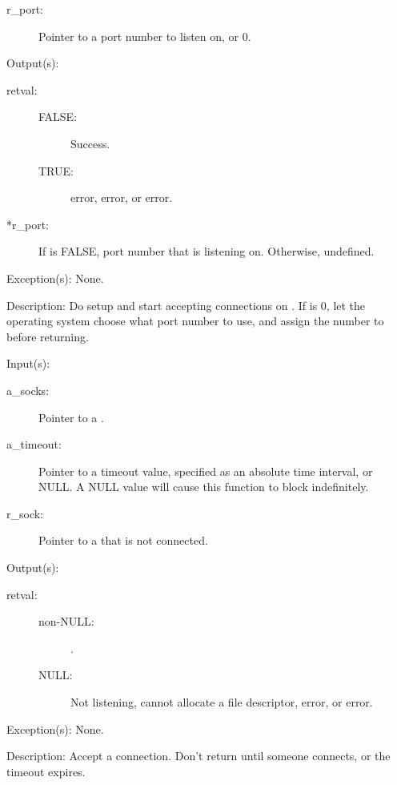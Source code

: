\begin{capi}
\begin{capilist}
\begin{description}
		\item[r\_port: ]
			Pointer to a port number to listen on, or 0.
		\end{description}
	\item[Output(s): ]
		\begin{description}\item[]
		\item[retval: ]
			\begin{description}\item[]
			\item[FALSE: ]
				Success.
			\item[TRUE: ]
				 error,  error, or
				 error.
			\end{description}
		\item[*r\_port: ]
			If  is FALSE, port number that
			 is listening on.  Otherwise, undefined.
		\end{description}
	\item[Exception(s): ] None.
	\item[Description: ]
		Do setup and start accepting connections on .  If
		 is 0, let the operating system choose what port
		number to use, and assign the number to  before
		returning.
	\end{capilist}
\label{socks_accept}
	\begin{capilist}
	\item[Input(s): ]
		\begin{description}\item[]
		\item[a\_socks: ]
			Pointer to a .
		\item[a\_timeout: ]
			Pointer to a timeout value, specified as an absolute
			time interval, or NULL.  A NULL value will cause this
			function to block indefinitely.
		\item[r\_sock: ]
			Pointer to a  that is not connected.
		\end{description}
	\item[Output(s): ]
		\begin{description}\item[]
		\item[retval: ]
			\begin{description}\item[]
			\item[non-NULL: ]
				.
			\item[NULL: ]
				Not listening, cannot allocate a file
				descriptor,  error, or
				 error.
			\end{description}
		\end{description}
	\item[Exception(s): ] None.
	\item[Description: ]
		Accept a connection.  Don't return until someone connects, or
		the timeout expires.
	\end{capilist}
\end{capi}
